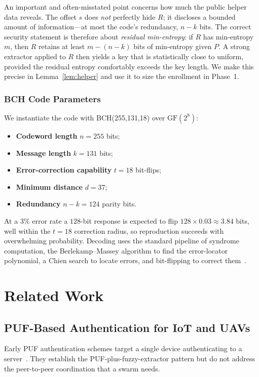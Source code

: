 \documentclass[11pt,a4paper]{article}
\begin{document}
An important and often-misstated point concerns how much the public helper data
reveals. The offset $s$ does \emph{not} perfectly hide $R$; it discloses a
bounded amount of information---at most the code's redundancy, $n-k$ bits. The
correct security statement is therefore about \emph{residual min-entropy}: if
$R$ has min-entropy $m$, then $R$ retains at least $m-(n-k)$ bits of
min-entropy given $P$. A strong extractor applied to $R$ then yields a key that
is statistically close to uniform, provided the residual entropy comfortably
exceeds the key length. We make this precise in
Lemma~\ref{lem:helper} and use it to size the enrollment in
Phase~1.

\subsubsection{BCH Code Parameters}

We instantiate the code with BCH(255,131,18) over $\mathrm{GF}(2^8)$:
\begin{itemize}[leftmargin=*]
  \item \textbf{Codeword length} $n = 255$ bits;
  \item \textbf{Message length} $k = 131$ bits;
  \item \textbf{Error-correction capability} $t = 18$ bit-flips;
  \item \textbf{Minimum distance} $d = 37$;
  \item \textbf{Redundancy} $n-k = 124$ parity bits.
\end{itemize}
At a $3\%$ error rate a $128$-bit response is expected to flip
$128 \times 0.03 \approx 3.84$ bits, well within the $t=18$ correction radius,
so reproduction succeeds with overwhelming probability. Decoding uses the
standard pipeline of syndrome computation, the Berlekamp--Massey algorithm to
find the error-locator polynomial, a Chien search to locate errors, and
bit-flipping to correct them~\cite{sram_puf_bch}.

\section{Related Work}
\label{sec:related}

\subsection{PUF-Based Authentication for IoT and UAVs}
Early PUF authentication schemes target a single device authenticating to a
server~\cite{puf_lightweight_uav,puf_iot_strong_adversary,arbiter_puf_iot}.
They establish the PUF-plus-fuzzy-extractor pattern but do not address the
peer-to-peer coordination that a swarm needs.
\end{document}
